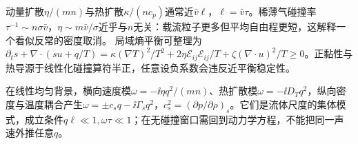 动量扩散$\eta/(mn)$与热扩散$\kappa/(nc_p)$通常近$\bar v\ell$，$\ell=\bar v\tau$。稀薄气碰撞率$\tau^{-1}\sim n\sigma\bar v$，$\eta\sim m\bar v/\sigma$近乎与$n$无关：载流粒子更多但平均自由程更短，这解释一个看似反常的密度取消。
局域熵平衡可整理为$\partial_ts+\nabla\cdot(su+q/T)=\kappa(\nabla T)^2/T^2+2\eta\mathcal E_{ij}\mathcal E_{ij}/T+\zeta(\nabla\cdot u)^2/T\ge0$。正黏性与热导源于线性化碰撞算符半正，任意设负系数会违反近平衡稳定性。

在线性均匀背景，横向速度模$\omega=-\ii\eta q^2/(mn)$、热扩散模$\omega=-\ii D_Tq^2$，纵向密度与温度耦合产生$\omega=\pm c_sq-\ii\Gamma_sq^2$，$c_s^2=(\partial p/\partial\rho)_s$。它们是流体尺度的集体模式，成立条件$q\ell\ll1,\omega\tau\ll1$；在无碰撞窗口需回到动力学方程，不能把同一声速外推任意$q$。
